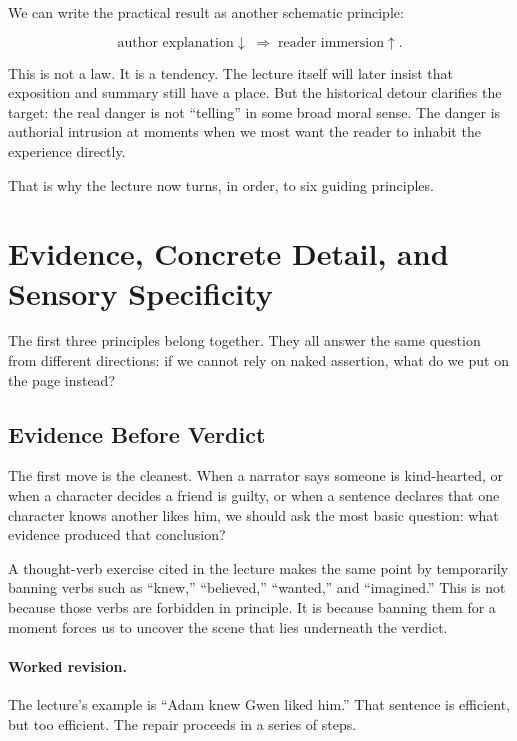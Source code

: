 We can write the practical result as another schematic principle:

\begin{equation}
\text{author explanation} \downarrow \;\Longrightarrow\; \text{reader immersion} \uparrow.
\end{equation}

This is not a law. It is a tendency. The lecture itself will later insist that exposition and summary still have a place. But the historical detour clarifies the target: the real danger is not ``telling'' in some broad moral sense. The danger is authorial intrusion at moments when we most want the reader to inhabit the experience directly.

That is why the lecture now turns, in order, to six guiding principles.

\section{Evidence, Concrete Detail, and Sensory Specificity}

The first three principles belong together. They all answer the same question from different directions: if we cannot rely on naked assertion, what do we put on the page instead?

\subsection{Evidence Before Verdict}

The first move is the cleanest. When a narrator says someone is kind-hearted, or when a character decides a friend is guilty, or when a sentence declares that one character knows another likes him, we should ask the most basic question: what evidence produced that conclusion?

A thought-verb exercise cited in the lecture makes the same point by temporarily banning verbs such as ``knew,'' ``believed,'' ``wanted,'' and ``imagined.'' This is not because those verbs are forbidden in principle. It is because banning them for a moment forces us to uncover the scene that lies underneath the verdict.

\paragraph{Worked revision.} The lecture's example is ``Adam knew Gwen liked him.'' That sentence is efficient, but too efficient. The repair proceeds in a series of steps.

